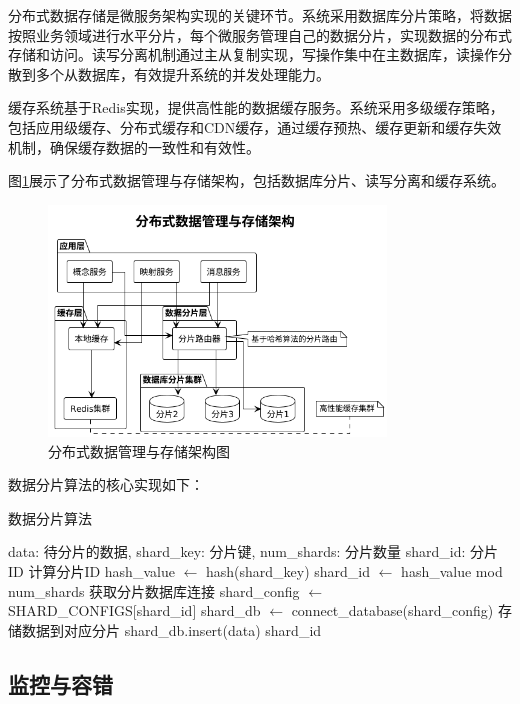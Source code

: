 分布式数据存储是微服务架构实现的关键环节。系统采用数据库分片策略，将数据按照业务领域进行水平分片，每个微服务管理自己的数据分片，实现数据的分布式存储和访问。读写分离机制通过主从复制实现，写操作集中在主数据库，读操作分散到多个从数据库，有效提升系统的并发处理能力。

缓存系统基于Redis实现，提供高性能的数据缓存服务。系统采用多级缓存策略，包括应用级缓存、分布式缓存和CDN缓存，通过缓存预热、缓存更新和缓存失效机制，确保缓存数据的一致性和有效性。

图\ref{fig:data_management}展示了分布式数据管理与存储架构，包括数据库分片、读写分离和缓存系统。

\begin{figure}[H]
    \centering
    \includegraphics[width=0.8\textwidth]{chapters/fig-0/data_management.png}
    \caption{分布式数据管理与存储架构图}
    \label{fig:data_management}
\end{figure}

数据分片算法的核心实现如下：

\begin{algorithm}[H]
\caption{数据分片算法}
\begin{algorithmic}[1]
\REQUIRE data: 待分片的数据, shard\_key: 分片键, num\_shards: 分片数量
\ENSURE shard\_id: 分片ID
\STATE 计算分片ID
\STATE hash\_value $\leftarrow$ hash(shard\_key)
\STATE shard\_id $\leftarrow$ hash\_value mod num\_shards
\STATE 获取分片数据库连接
\STATE shard\_config $\leftarrow$ SHARD\_CONFIGS[shard\_id]
\STATE shard\_db $\leftarrow$ connect\_database(shard\_config)
\STATE 存储数据到对应分片
\STATE shard\_db.insert(data)
\RETURN shard\_id
\end{algorithmic}
\end{algorithm}

\subsection{监控与容错}

